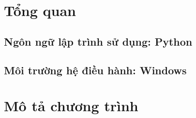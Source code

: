 \section{Tổng quan}
\subsection{Ngôn ngữ lập trình sử dụng: Python}
\subsection{Môi trường hệ điều hành: Windows}

\section{Mô tả chương trình}
